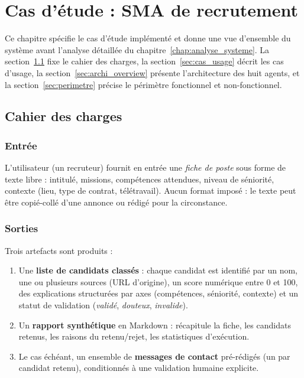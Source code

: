 \chapter{Cas d'étude : SMA de recrutement}
\label{chap:cas_etude}

Ce chapitre spécifie le cas d'étude implémenté et donne une vue d'ensemble du système avant l'analyse détaillée du chapitre~\ref{chap:analyse_systeme}. La section~\ref{sec:cdc} fixe le cahier des charges, la section~\ref{sec:cas_usage} décrit les cas d'usage, la section~\ref{sec:archi_overview} présente l'architecture des huit agents, et la section~\ref{sec:perimetre} précise le périmètre fonctionnel et non-fonctionnel.

\section{Cahier des charges}
\label{sec:cdc}

\subsection{Entrée}

L'utilisateur (un recruteur) fournit en entrée une \emph{fiche de poste} sous forme de texte libre : intitulé, missions, compétences attendues, niveau de séniorité, contexte (lieu, type de contrat, télétravail). Aucun format imposé : le texte peut être copié-collé d'une annonce ou rédigé pour la circonstance.

\subsection{Sorties}

Trois artefacts sont produits :

\begin{enumerate}
\item Une \textbf{liste de candidats classés} : chaque candidat est identifié par un nom, une ou plusieurs sources (URL d'origine), un score numérique entre 0 et 100, des explications structurées par axes (compétences, séniorité, contexte) et un statut de validation (\emph{validé}, \emph{douteux}, \emph{invalide}).
\item Un \textbf{rapport synthétique} en Markdown : récapitule la fiche, les candidats retenus, les raisons du retenu/rejet, les statistiques d'exécution.
\item Le cas échéant, un ensemble de \textbf{messages de contact} pré-rédigés (un par candidat retenu), conditionnés à une validation humaine explicite.
\end{enumerate}

